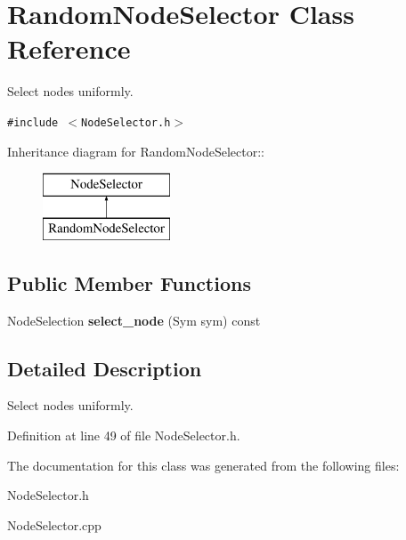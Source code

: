 \section{Random\-Node\-Selector Class Reference}
\label{class_random_node_selector}
Select nodes uniformly.  


{\tt \#include $<$Node\-Selector.h$>$}

Inheritance diagram for Random\-Node\-Selector::\begin{figure}[H]
\begin{center}
\leavevmode
\includegraphics[height=2cm]{class_random_node_selector}
\end{center}
\end{figure}
\subsection*{Public Member Functions}
\begin{CompactItemize}
\item 
Node\-Selection {\bf select\_\-node} (Sym sym) const \label{class_random_node_selector_a0}

\end{CompactItemize}


\subsection{Detailed Description}
Select nodes uniformly. 



Definition at line 49 of file Node\-Selector.h.

The documentation for this class was generated from the following files:\begin{CompactItemize}
\item 
Node\-Selector.h\item 
Node\-Selector.cpp\end{CompactItemize}
